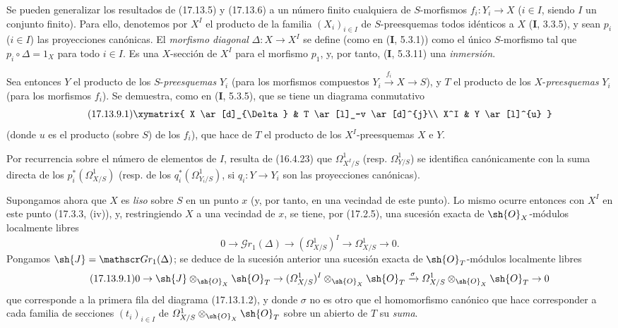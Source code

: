 \begin{env}[17.13.9]
\label{IV.17.13.9}
Se pueden generalizar los resultados de (17.13.5) y (17.13.6) a un número finito cualquiera de $S$-morfismos $f_i:Y_i\to X$ ($i\in I$, siendo $I$ un conjunto finito). Para ello, denotemos por $X^I$ el producto de la familia $(X_i)_{i\in I}$ de $S$-preesquemas todos idénticos a $X$ (\textbf I, 3.3.5), y sean $p_i$ ($i\in I$) las proyecciones canónicas. El \emph{morfismo diagonal} $\Delta:X\to X^I$ se define (como en (\textbf I, 5.3.1)) como el único $S$-morfismo tal que $p_i\circ\Delta=1_X$ para todo $i\in I$. Es una $X$-sección de $X^I$ para el morfismo $p_1$, y, por tanto, (\textbf I, 5.3.11) una \emph{inmersión}.


Sea entonces $Y$ el producto de los $S$-\emph{preesquemas} $Y_i$ (para los morfismos compuestos $Y_i\xrightarrow{f_i}X\to S$), y $T$ el producto de los $X$-\emph{preesquemas} $Y_i$ (para los morfismos $f_i$). Se demuestra, como en (\textbf I, 5.3.5), que se tiene un diagrama conmutativo
\[
\label{IV.17.13.9.1}
\tag{17.13.9.1}
\xymatrix{
  X \ar[d]_{\Delta} & T \ar[l]_-v \ar[d]^{j}\\
  X^I & Y \ar[l]^{u}
}
\]
(donde $u$ es el producto (sobre $S$) de los $f_i$), que hace de $T$ el producto de los $X^I$-preesquemas $X$ e $Y$.

Por recurrencia sobre el número de elementos de $I$, resulta de (16.4.23) que $\varOmega^1_{X^I/S}$ (resp. $\varOmega^1_{Y/S}$) se identifica canónicamente con la suma directa de los $p_i^*(\varOmega^1_{X/S})$ (resp. de los $q_i^*(\varOmega^1_{Y_i/S})$, si $q_i:Y\to Y_i$ son las proyecciones canónicas).

Supongamos ahora que $X$ es \emph{liso} sobre $S$ en un punto $x$ (y, por tanto, en una vecindad de este punto). Lo mismo ocurre entonces con $X^I$ en este punto (17.3.3, (iv)), y, restringiendo $X$ a una vecindad de $x$, se tiene, por (17.2.5), una sucesión exacta de $\sh{O}_X$-módulos localmente libres
\[
0\to\mathscr Gr_1(\Delta)\to(\varOmega^1_{X/S})^I\to\varOmega^1_{X/S}\to0.
\]
Pongamos $\sh{J}=\mathscr Gr_1(\Delta)$; se deduce de la sucesión anterior una sucesión exacta de $\sh{O}_T$-módulos localmente libres
\[
\label{IV.17.13.9.1-seq}
\tag{17.13.9.1}
0\to\sh{J}\otimes_{\sh{O}_X}\sh{O}_T\to(\varOmega^1_{X/S})^I\otimes_{\sh{O}_X}\sh{O}_T\xrightarrow{\sigma}\varOmega^1_{X/S}\otimes_{\sh{O}_X}\sh{O}_T\to0
\]
que corresponde a la primera fila del diagrama (17.13.1.2), y donde $\sigma$ no es otro que el homomorfismo canónico que hace corresponder a cada familia de secciones $(t_i)_{i\in I}$ de $\varOmega^1_{X/S}\otimes_{\sh{O}_X}\sh{O}_T$ sobre un abierto de $T$ su \emph{suma}.


\end{env}
